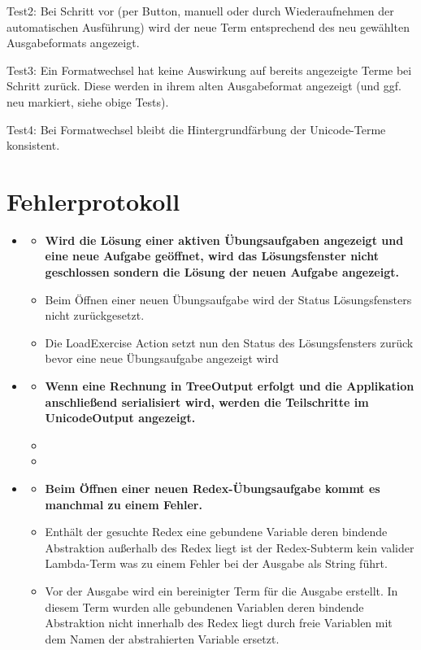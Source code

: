 \documentclass[parskip=full,11pt,openany]{scrreprt}
\begin{document}
Test2: Bei Schritt vor (per Button, manuell oder durch Wiederaufnehmen der automatischen Ausführung) wird der neue Term entsprechend des neu gewählten Ausgabeformats angezeigt. 

Test3: Ein Formatwechsel hat keine Auswirkung auf bereits angezeigte Terme bei Schritt zurück. Diese werden in ihrem alten Ausgabeformat angezeigt (und ggf. neu markiert, siehe obige Tests).

Test4: Bei Formatwechsel bleibt die Hintergrundfärbung der Unicode-Terme konsistent. %


\chapter{Fehlerprotokoll}

\begin{itemize}[itemsep=3ex]

\newcommand{\issue}[3]{%
\item[]
\begin{itemize}[noitemsep]
\item[]\textbf{#1}
\item[\textbf{Grund:}]#2
\item[\textbf{Behebung:}]#3
\end{itemize}}


\issue{Wird die Lösung einer aktiven Übungsaufgaben angezeigt und eine neue Aufgabe geöffnet, wird das Lösungsfenster nicht geschlossen sondern die Lösung der neuen Aufgabe angezeigt. }
{Beim Öffnen einer neuen Übungsaufgabe wird der Status Lösungsfensters nicht zurückgesetzt.}
{Die LoadExercise Action setzt nun den Status des Lösungsfensters zurück bevor eine neue Übungsaufgabe angezeigt wird}

\issue{Wenn eine Rechnung in TreeOutput erfolgt und die Applikation anschließend serialisiert wird, werden die Teilschritte im UnicodeOutput angezeigt.}
{}
{}

\issue{Beim Öffnen einer neuen Redex-Übungsaufgabe kommt es manchmal zu einem Fehler.}
{Enthält der gesuchte Redex eine gebundene Variable deren bindende Abstraktion außerhalb des Redex liegt ist der Redex-Subterm kein valider Lambda-Term was zu einem Fehler bei der Ausgabe als String führt.}
{Vor der Ausgabe wird ein bereinigter Term für die Ausgabe erstellt. In diesem Term wurden alle gebundenen Variablen deren bindende Abstraktion nicht innerhalb des Redex liegt durch freie Variablen mit dem Namen der abstrahierten Variable ersetzt.}


\end{itemize}
\end{document}
